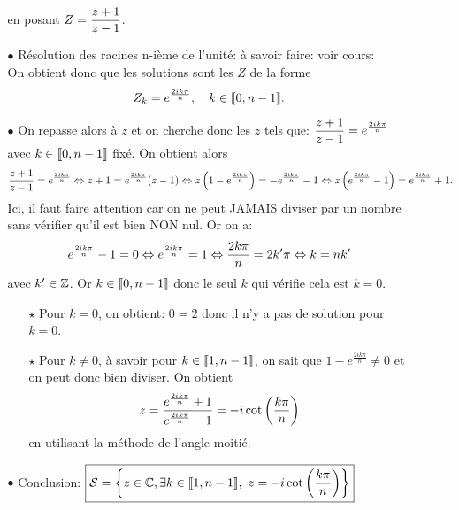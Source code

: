 \documentclass[a4paper, 11pt]{article}
\begin{document}
\begin{correction}
\begin{enumerate}
\begin{itemize}
en posant $Z=\displaystyle\frac{z+1}{z-1}$.
\item[$\bullet$] R\'esolution des racines n-i\`{e}me de l'unit\'e: \`{a} savoir faire: voir cours:\\
\noindent On obtient donc que les solutions sont les $Z$ de la forme
$$Z_k=e^{\frac{2ik\pi}{n}},\quad k\in\llbracket  0,n-1\rrbracket.$$
\item[$\bullet$] On repasse alors \`{a} $z$ et on cherche donc les $z$ tels que: $\displaystyle\frac{z+1}{z-1}=e^{\frac{2ik\pi}{n}}$ avec $k\in\llbracket  0,n-1\rrbracket$ fix\'e. On obtient alors
$$\displaystyle\frac{z+1}{z-1}=e^{\frac{2ik\pi}{n}}\Leftrightarrow z+1=e^{\frac{2ik\pi}{n}} (z-1)\Leftrightarrow z\left(1- e^{\frac{2ik\pi}{n}} \right)=-e^{\frac{2ik\pi}{n}}-1\Leftrightarrow z\left(e^{\frac{2ik\pi}{n}} -1\right)=e^{\frac{2ik\pi}{n}}+1.$$
Ici, il faut faire attention car on ne peut JAMAIS diviser par un nombre sans v\'erifier qu'il est bien NON nul. Or on a:
$$e^{\frac{2ik\pi}{n}} -1=0\Leftrightarrow e^{\frac{2ik\pi}{n}} =1\Leftrightarrow \displaystyle\frac{2k\pi}{n}=2k^{\prime}\pi\Leftrightarrow k=nk^{\prime}$$
avec $k^{\prime}\in\mathbb{Z}$. Or $k\in\llbracket  0,n-1\rrbracket$ donc le seul $k$ qui v\'erifie cela est $k=0$. 
\begin{itemize}
\item[$\star$] Pour $k=0$, on obtient: $0=2$ donc il n'y a pas de solution pour $k=0$.
\item[$\star$] Pour $k\not= 0$, \`{a} savoir pour $k\in\llbracket  1,n-1\rrbracket$, on sait que $1- e^{\frac{2ik\pi}{n}}\not= 0$ et on peut donc bien diviser. On obtient
$$z=\displaystyle\frac{e^{\frac{2ik\pi}{n}}+1}{e^{\frac{2ik\pi}{n}} -1}=-i\cot{\left( \displaystyle\frac{k\pi}{n} \right)}$$
en utilisant la m\'ethode de l'angle moiti\'e.
\end{itemize}
\item[$\bullet$] Conclusion: $\fbox{$ \mathcal{S}=\left\lbrace  z\in\bC,\exists k\in\intent{ 1,n-1},\ z=-i\cot{\left( \ddp\frac{k\pi}{n} \right)}  \right\rbrace $}$
\end{itemize}
\end{enumerate}
\end{correction}
\end{document}
